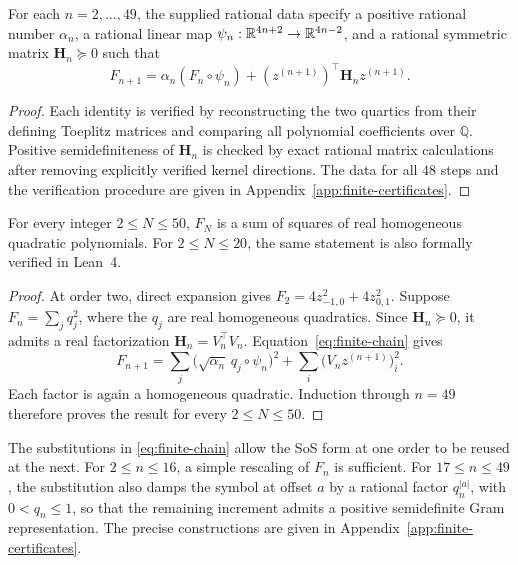 \begin{lemma}
\label{lem:finite-increments}
For each $n=2,\ldots,49$, the supplied rational data specify a
positive rational number $\alpha_n$, a rational linear map
$\psi_n:\mathbb{R}^{4n+2}\to\mathbb{R}^{4n-2}$, and a rational symmetric matrix
$\mathbf H_n\succeq0$ such that
\begin{equation}\label{eq:finite-chain}
 F_{n+1}
 =
 \alpha_n(F_n\circ\psi_n)
 +(z^{(n+1)})^\top\mathbf H_nz^{(n+1)}.
\end{equation}
\end{lemma}

\begin{proof}
Each identity is verified by reconstructing the two quartics from
their defining Toeplitz matrices and comparing all polynomial
coefficients over $\mathbb Q$. Positive semidefiniteness of
$\mathbf H_n$ is checked by exact rational matrix calculations after
removing explicitly verified kernel directions. The data for all
$48$ steps and the verification procedure are given in
Appendix~\ref{app:finite-certificates}.
\end{proof}


\begin{theorem}
\label{thm:finite-positive}
For every integer $2\le N\le50$, $F_N$ is a sum of squares of real
homogeneous quadratic polynomials. For $2\le N\le20$, the same
statement is also formally verified in Lean~4.
\end{theorem}

\begin{proof}
At order two, direct expansion gives
$
 F_2=4z_{-1,0}^2+4z_{0,1}^2.
$
Suppose $F_n=\sum_j q_j^2$, where the $q_j$ are real homogeneous
quadratics. Since $\mathbf H_n\succeq0$, it admits a real factorization
$\mathbf H_n=V_n^\top V_n$. Equation~\eqref{eq:finite-chain} gives
\[
 F_{n+1}
 =
 \sum_j\bigl(\sqrt{\alpha_n}\,q_j\circ\psi_n\bigr)^2
 +
 \sum_i\bigl(V_nz^{(n+1)}\bigr)_i^2.
\]
Each factor is again a homogeneous quadratic. Induction through
$n=49$ therefore proves the result for every $2\le N\le50$.
\end{proof}

The substitutions in \eqref{eq:finite-chain} allow the SoS form at one
order to be reused at the next. For $2\le n\le16$, a simple rescaling
of $F_n$ is sufficient. For $17\le n\le49$, the substitution also
damps the symbol at offset $a$ by a rational factor $q_n^{|a|}$,
with $0<q_n\le1$, so that the remaining increment admits a positive
semidefinite Gram representation. The precise constructions are given
in Appendix~\ref{app:finite-certificates}. 

